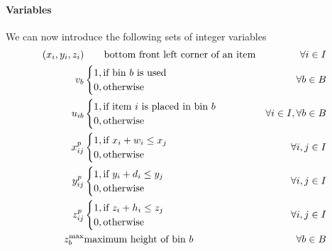 \paragraph*{Variables} We can now introduce the following sets of integer variables
\begin{align}
              (x_i,y_i,z_i) & \qquad \text{bottom front left corner of an item} & \forall i \in I \label{var:item_pos} \\
                    v_{b} & \begin{cases}
                                            1, \text{if bin $b$ is used} \\ 
                                            0, \text{otherwise}
                                        \end{cases} & \forall b \in B \notag \\
                    u_{ib} & \begin{cases}
                                            1, \text{if item $i$ is placed in bin $b$} \\ 
                                            0, \text{otherwise}
                                        \end{cases} & \forall i \in I, \forall b \in B  \notag \\
                    x^p_{ij} & \begin{cases}
                                            1, \text{if $x_i + w_i \le x_j$} \\ 
                                            0, \text{otherwise}
                                        \end{cases} & \forall i,j \in I \notag \\
                    y^p_{ij} & \begin{cases}
                                            1, \text{if $y_i + d_i \le y_j$} \\ 
                                            0, \text{otherwise}
                                        \end{cases} & \forall i,j \in I \notag \\
                    z^p_{ij} & \begin{cases}
                                            1, \text{if $z_i + h_i \le z_j$} \\ 
                                            0, \text{otherwise}
                                        \end{cases} & \forall i,j \in I \notag \\
            z_b^\text{max} & \text{maximum height of bin $b$} & \forall b \in B \notag
\end{align}

